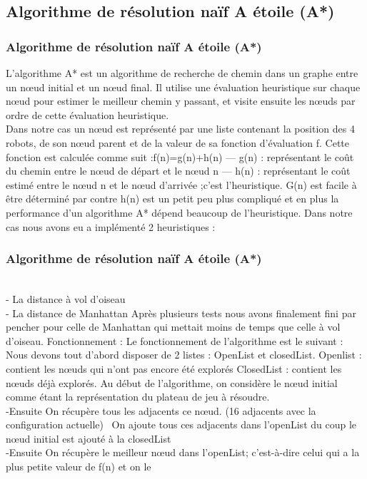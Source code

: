 \documentclass{beamer}
\begin{document}
	\subsection{Algorithme de résolution naïf A étoile (A*)}
	\begin{frame}
		\frametitle{Algorithme de résolution naïf A étoile (A*)}
		
			L’algorithme A* est un algorithme de recherche de chemin dans un graphe entre un nœud initial et un nœud final. Il utilise une évaluation heuristique sur chaque nœud pour estimer le meilleur chemin y passant, et visite ensuite les nœuds par ordre de cette évaluation heuristique.
		\\Dans notre cas un nœud est représenté par une liste contenant la position des 4 robots, de son nœud parent et de la valeur de sa fonction d’évaluation f.
		Cette fonction est calculée comme suit :f(n)=g(n)+h(n)
		— g(n) : représentant le coût du chemin entre le nœud de départ et le nœud n
		— h(n) : représentant le coût estimé entre le nœud n et le nœud d’arrivée ;c’est l’heuristique.
		G(n) est facile à être déterminé par contre h(n) est un petit peu plus compliqué et en plus la performance d’un algorithme A* dépend beaucoup de l’heuristique.
		Dans notre cas nous avons eu a implémenté 2 heuristiques :
			\end{frame}
		\begin{frame}
			\frametitle{Algorithme de résolution naïf A étoile (A*)}
		\\-  La distance à vol d’oiseau
		\\-  La distance de Manhattan
		Après plusieurs tests nous avons finalement fini par pencher pour celle de Manhattan qui mettait moins de temps que celle à vol d’oiseau.
		Fonctionnement : Le fonctionnement de l’algorithme est le suivant : Nous devons tout d’abord disposer de 2 listes : OpenList et closedList.
		Openlist : contient les nœuds qui n’ont pas encore été explorés
		ClosedList : contient les nœuds déjà explorés.
		Au début de l’algorithme, on considère le nœud initial comme étant la représentation du plateau de jeu à résoudre.
		\\-Ensuite On récupère tous les adjacents ce nœud. (16 adjacents avec la configuration actuelle)
		\		\-On ajoute tous ces adjacents dans l’openList du coup le nœud initial est ajouté à la closedList
		\\-Ensuite On récupère le meilleur nœud dans l’openList; c’est-à-dire celui qui a la plus petite valeur de f(n) et on  le 
	\end{frame}
\end{document}
